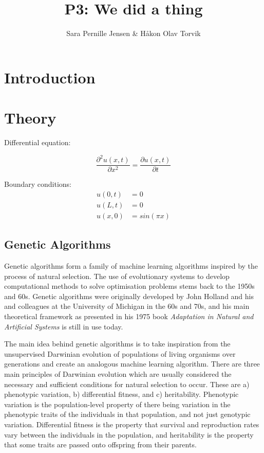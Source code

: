 \documentclass[multicolumn, 12pt]{extarticle}
\author{\Large Sara Pernille Jensen \& Håkon Olav Torvik}
\title{\Huge P3: We did a thing}
\affiliation{\large FYS-STK4155 – Applied Data Analysis and Machine Learning
\\Autumn 2021\\Department of Physics\\University of Oslo\\\\\today}
\begin{document}


\maketitle

\pagestyle{myplain}


\twocolumn
\section{Introduction}


\section{Theory}
 
Differential equation:
 
\begin{equation}
\label{eq:diff}
    \frac{\partial^2 u(x, t) }{\partial x^2} = \frac{\partial u(x, t)}{\partial t}
\end{equation}

Boundary conditions: 
\begin{align}
\label{eq:boundary}
    u(0, t) &= 0  \\
    u(L, t) &= 0  \\
    u(x, 0) &= sin(\pi x) 
\end{align}



\subsection{Genetic Algorithms}
Genetic algorithms form a family of machine learning algorithms inspired by the process of natural selection. The use of evolutionary systems to develop computational methods to solve optimisation problems stems back to the 1950s and 60s. Genetic algorithms were originally developed by John Holland and his and colleagues at the University of Michigan in the 60s and 70s, and his main theoretical framework as presented in his 1975 book \textit{Adaptation in Natural and Artificial Systems} \cite{Holland} is still in use today. 

The main idea behind genetic algorithms is to take inspiration from the unsupervised Darwinian evolution of populations of living organisms over generations and create an analogous machine learning algorithm. There are three main principles of Darwinian evolution which are usually considered the necessary and sufficient conditions for natural selection to occur. These are a) phenotypic variation, b) differential fitness, and c) heritability. Phenotypic variation is the population-level property of there being variation in the phenotypic traits of the individuals in that population, and not just genotypic variation. Differential fitness is the property that survival and reproduction rates vary between the individuals in the population, and heritability is the property that some traits are passed onto offspring from their parents. 
\end{document}
